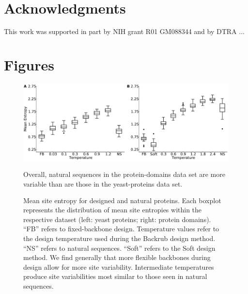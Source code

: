\documentclass[12pt]{article}
\begin{document}
\section{Acknowledgments}

This work was supported in part by NIH grant R01 GM088344 and by {\color{red}DTRA ...}


\cleardoublepage

\section{Figures}

\begin{figure}[H]
\centerline{\includegraphics[width = 6in]{figures/Mean_Entropy_vs_Temp_Combo_Boxplot.pdf}} %
\caption{Mean site entropy for designed and natural proteins. Each boxplot represents the distribution of mean site entropies within the respective dataset (left: yeast proteins; right: protein domains). ``FB'' refers to fixed-backbone design. Temperature values refer to the design temperature used during the Backrub design method. ``NS'' refers to natural sequences. ``Soft'' refers to the Soft design method. We find generally that more flexible backbones during design allow for more site variability. Intermediate temperatures produce site variabilities most similar to those seen in natural sequences.} Overall, natural sequences in the protein-domains data set are more variable than are those in the yeast-proteins data set.
\label{MeanEntropyComparison}
\end{figure}
\end{document}
